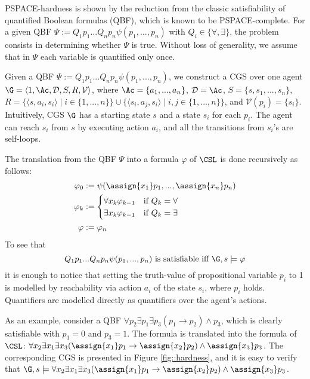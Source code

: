 PSPACE-hardness is shown by the reduction from the classic satisfiability of quantified Boolean formulas (QBF), which is known to be PSPACE-complete. For a given QBF $\Psi:=Q_1 p_1 ... Q_n p_n \psi (p_1, ..., p_n)$ with $Q_i \in \{\forall, \exists\}$, the problem consists in determining whether $\Psi$ is true. Without loss of generality, we assume that in $\Psi$ each variable is quantified only once.

    Given a QBF $\Psi:=Q_1 p_1 ... Q_n p_n \psi (p_1, ..., p_n)$, we construct a CGS over one agent $\G = \langle 1, \Ac, \mathcal{D}, S, R, \mathcal{V} \rangle$, where $\Ac = \{a_1, ..., a_n\}$, $\mathcal{D} = \Ac$, $S = \{s, s_1, ..., s_n\}$, $R = \{\langle s, a_i, s_i\rangle \mid i \in \{1,...,n\}\} \cup \{\langle s_i, a_j, s_i \rangle \mid i,j \in \{1,...,n\}\}$, and $\mathcal{V}(p_i) = \{s_i\}$. Intuitively, CGS $\G$ has a starting state $s$ and a state $s_i$ for each $p_i$. The agent can reach $s_i$ from $s$ by executing action $a_i$, and all the transitions from $s_i$'s are self-loops.

    The translation from the QBF $\Psi$ into a formula $\varphi$ of $\CSL$ is done recursively as follows: 
    \begin{align*}
    \varphi_0 &:= \psi(\assign{x_1} p_1, ..., \assign{x_n}p_n) \\
    \varphi_k &:=
    \begin{cases}
        \forall x_k \varphi_{k-1} &\text{if } Q_k = \forall\\ 
        \exists x_k \varphi_{k-1} &\text{if } Q_k = \exists\\
    \end{cases}\\
\varphi &:= \varphi_n
\end{align*}
To see that 
$$Q_1 p_1 ... Q_n p_n \psi (p_1, ..., p_n) \text{ is satisfiable iff } \G,s \models \varphi$$
it is enough to notice that setting the truth-value of propositional variable $p_i$ to 1 is modelled by reachability via action $a_i$ of the state $s_i$, where $p_i$ holds. Quantifiers are modelled directly as quantifiers over the agent's actions. 

As an example, consider a QBF $\forall p_2 \exists p_1 \exists p_3 (p_1 \to p_2) \land p_3$, which is clearly satisfiable with $p_1 = 0$ and $p_3 = 1$. The formula is translated into the formula of $\CSL$: $\forall x_2 \exists x_1  \exists x_3 (\assign{x_1}p_1 \to \assign{x_2}p_2) \land \assign{x_3}p_3$. The corresponding CGS is presented in Figure \ref{fig::hardness}, and it is easy to verify that $\G,s \models \forall x_2 \exists x_1  \exists x_3 (\assign{x_1}p_1 \to \assign{x_2}p_2) \land \assign{x_3}p_3$.

